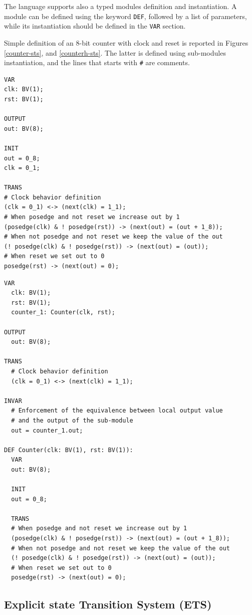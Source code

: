 \documentclass{article}
\theoremstyle{definition}
\begin{document}
The language supports also a typed modules definition and
instantiation. A module can be defined using the keyword \texttt{DEF}, followed
by a list of parameters, while its instantiation should be defined in
the \texttt{VAR} section.

Simple definition of an 8-bit counter with clock and reset is reported
in Figures \ref{counter-sts}, and \ref{counterh-sts}. The latter is
defined using sub-modules instantiation, and the lines that starts
with \texttt{\#} are comments.

\begin{lstlisting}[frame=single,language=sts,caption=Counter example,label=counter-sts]
VAR
clk: BV(1);
rst: BV(1);

OUTPUT
out: BV(8);

INIT
out = 0_8;
clk = 0_1;

TRANS
# Clock behavior definition
(clk = 0_1) <-> (next(clk) = 1_1);
# When posedge and not reset we increase out by 1
(posedge(clk) & ! posedge(rst)) -> (next(out) = (out + 1_8));
# When not posedge and not reset we keep the value of the out
(! posedge(clk) & ! posedge(rst)) -> (next(out) = (out));
# When reset we set out to 0
posedge(rst) -> (next(out) = 0);
\end{lstlisting}


\begin{lstlisting}[frame=single,language=sts,caption=Counter example (hierarchical),label=counterh-sts]
VAR
  clk: BV(1);
  rst: BV(1);
  counter_1: Counter(clk, rst);

OUTPUT
  out: BV(8);

TRANS
  # Clock behavior definition
  (clk = 0_1) <-> (next(clk) = 1_1);

INVAR
  # Enforcement of the equivalence between local output value
  # and the output of the sub-module
  out = counter_1.out;

DEF Counter(clk: BV(1), rst: BV(1)):
  VAR
  out: BV(8);

  INIT
  out = 0_8;

  TRANS
  # When posedge and not reset we increase out by 1
  (posedge(clk) & ! posedge(rst)) -> (next(out) = (out + 1_8));
  # When not posedge and not reset we keep the value of the out
  (! posedge(clk) & ! posedge(rst)) -> (next(out) = (out));
  # When reset we set out to 0
  posedge(rst) -> (next(out) = 0);
\end{lstlisting}


\subsection{Explicit state Transition System (ETS)}
\end{document}

